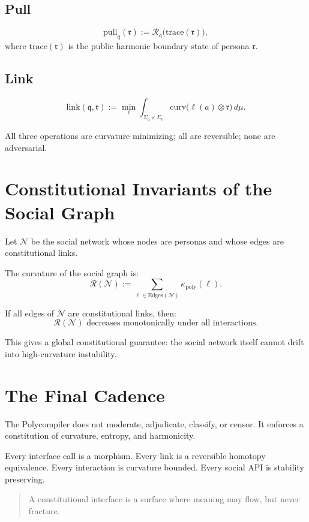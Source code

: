 \subsection{Pull}

\begin{definition}
\[
\mathrm{pull}_{\mathfrak{q}}(\mathfrak{r})
:= 
\mathcal{R}_{\mathfrak{q}}
\bigl(
\mathrm{trace}(\mathfrak{r})
\bigr),
\]
where $\mathrm{trace}(\mathfrak{r})$ is the public harmonic boundary state of 
persona $\mathfrak{r}$.
\end{definition}

\subsection{Link}

\begin{definition}
\[
\mathrm{link}(\mathfrak{q},\mathfrak{r})
:= 
\min_{\ell}
\int_{\Sigma_{\mathfrak{q}}\times\Sigma_{\mathfrak{r}}}
\mathrm{curv}\bigl(\ell(a)\otimes \mathfrak{r}\bigr)
\, d\mu.
\]
\end{definition}

All three operations are curvature minimizing; all are reversible;  
none are adversarial.


\section{Constitutional Invariants of the Social Graph}

Let $\mathcal{N}$ be the social network whose nodes are personas and whose edges 
are constitutional links.

\begin{definition}
The curvature of the social graph is:
\[
\mathcal{R}(\mathcal{N})
:= 
\sum_{\ell \in \mathrm{Edges}(\mathcal{N})}
\kappa_{\mathrm{poly}}(\ell).
\]
\end{definition}

\begin{theorem}
If all edges of $\mathcal{N}$ are constitutional links, then:
\[
\mathcal{R}(\mathcal{N})
\text{ decreases monotonically under all interactions.}
\]
\end{theorem}

This gives a global constitutional guarantee:
the social network itself cannot drift into high-curvature instability.


\section{The Final Cadence}

The Polycompiler does not moderate, adjudicate, classify, or censor.  
It enforces a constitution of curvature, entropy, and harmonicity.

Every interface call is a morphism.  
Every link is a reversible homotopy equivalence.  
Every interaction is curvature bounded.  
Every social API is stability preserving.

\begin{quote}
A constitutional interface is a surface where meaning may flow,  
but never fracture.
\end{quote}
